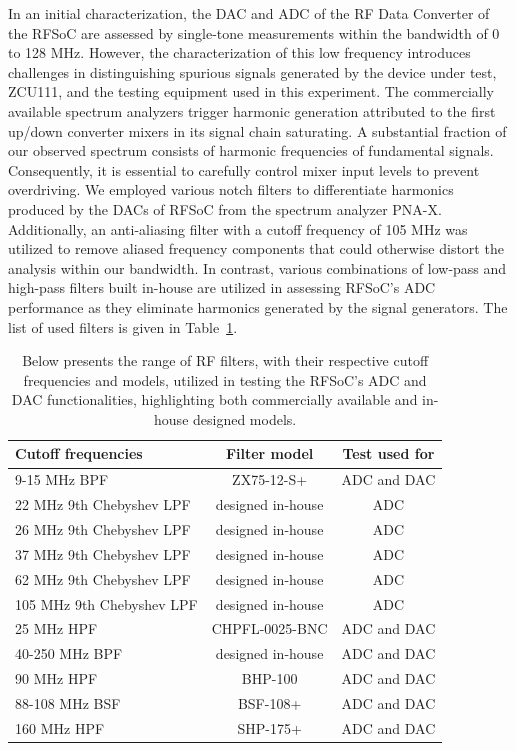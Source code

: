 \documentclass[fleqn,usenatbib]{rasti}
\begin{document}
In an initial characterization, the DAC and ADC of the RF Data Converter of the RFSoC are assessed by single-tone measurements within the bandwidth of 0 to 128 MHz. However, the characterization of this low frequency introduces challenges in distinguishing spurious signals generated by the device under test, ZCU111, and the testing equipment used in this experiment. The commercially available spectrum analyzers trigger harmonic generation attributed to the first up/down converter mixers in its signal chain saturating. A substantial fraction of our observed spectrum consists of harmonic frequencies of fundamental signals. Consequently, it is essential to carefully control mixer input levels to prevent overdriving. We employed various notch filters to differentiate harmonics produced by the DACs of RFSoC from the spectrum analyzer PNA-X. Additionally, an anti-aliasing filter with a cutoff frequency of 105 MHz was utilized to remove aliased frequency components that could otherwise distort the analysis within our bandwidth. In contrast, various combinations of low-pass and high-pass filters built in-house are utilized in assessing RFSoC's ADC performance as they eliminate harmonics generated by the signal generators. The list of used filters is given in Table~\ref{table:RFfilters}.

\begin{table}
\caption{Below presents the range of RF filters, with their respective cutoff frequencies and models, utilized in testing the RFSoC's ADC and DAC functionalities, highlighting both commercially available and in-house designed models.}
\centering \footnotesize
\label{table:RFfilters}
\begin{threeparttable}
\begin{tabular}{l c c}
\toprule
Cutoff frequencies & Filter model & Test used for\\ 
\midrule
9-15 MHz BPF & ZX75-12-S+ & ADC and DAC \\
22 MHz 9th Chebyshev LPF & designed in-house & ADC \\
26 MHz 9th Chebyshev LPF & designed in-house & ADC \\
37 MHz 9th Chebyshev LPF & designed in-house & ADC \\
62 MHz 9th Chebyshev LPF & designed in-house & ADC \\
105 MHz 9th Chebyshev LPF & designed in-house & ADC \\
25 MHz HPF & CHPFL-0025-BNC & ADC and DAC \\
40-250 MHz BPF & designed in-house & ADC and DAC \\
90 MHz HPF & BHP-100 & ADC and DAC \\
88-108 MHz BSF & BSF-108+ & ADC and DAC \\
160 MHz HPF & SHP-175+ & ADC and DAC \\
\bottomrule
\end{tabular}
\end{threeparttable}
\end{table}
\end{document}
